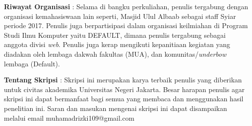 \noindent \textbf{Riwayat Organisasi} : Selama di bangku perkuliahan, penulis tergabung dengan organisasi kemahasiswaan lain seperti, Masjid Ulul Albaab sebagai staff Syiar periode 2017.  Penulis juga berpartisipasi dalam organisasi keilmiahan di Program Studi Ilmu Komputer yaitu DEFAULT, dimana penulis tergabung sebagai anggota divisi \textit{web}. Penulis juga kerap mengikuti kepanitiaan kegiatan yang diadakan oleh lembaga dakwah fakultas (MUA), dan komunitas/\textit{underbow} lembaga (Default). 

\noindent \textbf{Tentang Skripsi} : Skripsi ini merupakan karya terbaik penulis yang diberikan untuk civitas akademika Universitas Negeri Jakarta. Besar harapan penulis agar skripsi ini dapat bermanfaat bagi semua yang membaca dan menggunakan hasil penelitian ini. Saran dan masukan mengenai skripsi ini dapat disampaikan melalui email muhamadrizki109@gmail.com